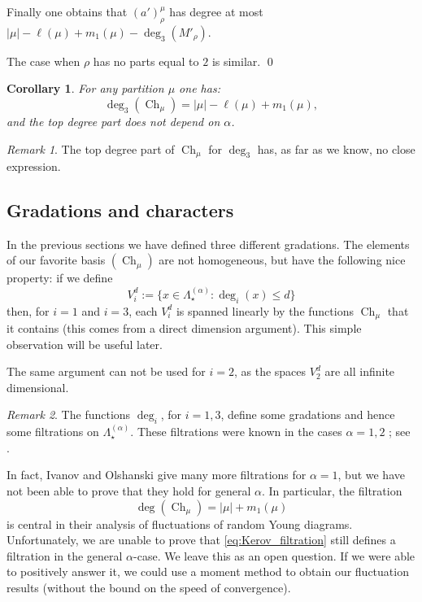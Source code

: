 \documentclass[11pt]{amsart}
\theoremstyle{plain}
\newtheorem{corollary}[lemma]{Corollary}
\theoremstyle{remark}
\newtheorem*{remark}{Remark}
\newcommand{\Pola}{\Lambda_\star^{(\alpha)}}
\DeclareMathOperator{\Ch}{Ch}
\begin{document}
Finally one obtains that $(a')^\mu_\rho$ has degree at most
$|\mu|-\ell(\mu)+m_1(\mu) - \deg_3(M'_{\rho})$.

The case when $\rho$ has no parts equal to $2$ is similar. \qed

\begin{corollary}
For any partition $\mu$ one has:
\[ \deg_3(\Ch_\mu) = |\mu| - \ell(\mu)+m_1(\mu),\]
and the top degree part does not depend on $\alpha$.
    \label{corol:deg3_Ch}
\end{corollary}

\begin{remark}
The top degree part of $\Ch_\mu$ for $\deg_3$ has, as far as we know,
no close expression.
\end{remark}


\subsection{Gradations and characters}\label{SubsectDegCh}
In the previous sections we have defined three different gradations.
The elements of our favorite basis $(\Ch_\mu)$ are not homogeneous,
but have the following nice property:
if we define
\[ V_i^d := \{x \in \Pola : \deg_i(x) \leq d\} \]
then, for $i=1$ and $i=3$, each $V_i^d$ is spanned linearly
by the functions $\Ch_\mu$ that it contains
(this comes from a direct dimension argument).
This simple observation will be useful later.

The same argument can not be used for $i=2$, as the spaces $V_2^d$
are all infinite dimensional.

\begin{remark}
    The functions $\deg_i$, for $i=1,3$, define some gradations and 
    hence some filtrations on $\Pola$.
    These filtrations were known in the cases $\alpha=1,2$ ;
    see \cite{IvanovOlshanski2002,FerayInductionJM,Tout-Structure-constant-S2n-Hn}.

    In fact, Ivanov and Olshanski \cite[Proposition 4.9]{IvanovOlshanski2002}
    give many more filtrations for $\alpha=1$,
    but we have not been able to prove that 
    they hold for general $\alpha$.
    In particular, the filtration
    \begin{equation}\label{eq:Kerov_filtration}
    \deg(\Ch_\mu)=|\mu|+m_1(\mu)
    \end{equation}
     is central in their analysis of fluctuations
    of random Young diagrams.
    Unfortunately, we are unable to prove that
    \eqref{eq:Kerov_filtration} still defines a filtration in the general $\alpha$-case.
    We leave this as an open question.
    If we were able to positively answer it,
    we could use a moment method to obtain our fluctuation results
    (without the bound on the speed of convergence).
\end{remark}
\end{document}
